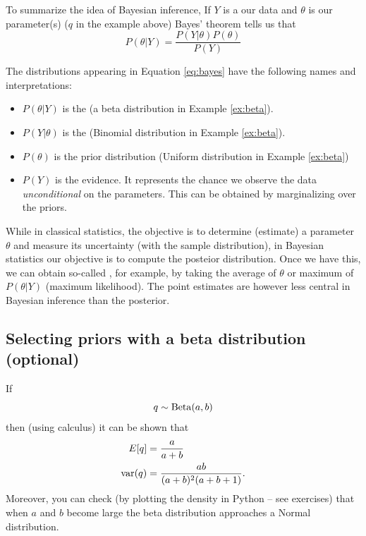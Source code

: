  To summarize the idea of Bayesian inference, If $Y$ is a our data and $\theta$ is our parameter(s) ($q$ in the example above) Bayes' theorem tells us that 
\begin{equation}\label{eq:bayes}
P(\theta|Y) = \frac{P(Y|\theta)P(\theta)}{P(Y)}
\end{equation}



 The distributions appearing in Equation \eqref{eq:bayes} have the following names and interpretations:
\begin{itemize}
\item $P(\theta|Y)$ is the  (a beta distribution in Example \ref{ex:beta}).
\item $P(Y|\theta)$ is the  (Binomial distribution in Example \ref{ex:beta}).
\item $P(\theta)$ is the prior distribution (Uniform distribution in Example \ref{ex:beta})
\item $P(Y)$ is the evidence. It represents the chance we observe the data \emph{unconditional} on the parameters. This can be obtained by marginalizing over the priors.
\end{itemize}


While in classical statistics, the objective is to determine (estimate) a parameter $\theta$ and measure its uncertainty (with the sample distribution), in Bayesian statistics our objective is to compute the posteior distribution. Once we have this, we can obtain so-called , for example, by taking the average of $\theta$ or maximum of $P(\theta|Y)$ (maximum likelihood).  The point estimates are however less central in Bayesian inference than the posterior. 

\subsection{Selecting priors with a beta distribution (optional)}
If
\begin{equation*}
q \sim {\rm Beta}(a,b)
\end{equation*}
then (using calculus) it can be shown that 
\begin{align}\label{eq:betameanvar}
E[q] &= \frac{a}{a+b}\\
{\rm var}(q) &= \frac{ab}{(a+b)^2(a+b+1)}.
\end{align}
Moreover, you can check (by plotting the density in Python -- see exercises) that when $a$ and $b$ become large the beta distribution approaches a Normal distribution. 


